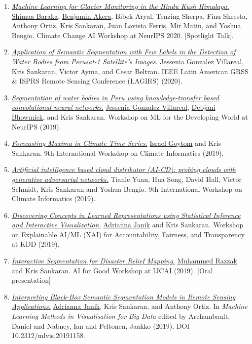 \documentclass[letterpaper]{article}
\begin{document}
\begin{enumerate}
  \item \href{https://www.climatechange.ai/papers/neurips2020/57}{\textit{Machine Learning for Glacier Monitoring in the Hindu Kush Himalaya.}} \underline{Shimaa Baraka}, \underline{Benjamin Akera}, Bibek Aryal, Tenzing Sherpa, Finu Shresta, Anthony Ortiz, Kris Sankaran, Juan Lavista Ferris, Mir Matin, and Yoshua Bengio. Climate Change AI Workshop at NeurIPS 2020. [Spotlight Talk].
  \item \href{https://ieeexplore.ieee.org/document/9165643/}{\textit{Application of Semantic Segmentation with Few Labels in the Detection of Water Bodies from Perusat-1 Satellite's Images.}} \underline{Jessenia Gonzalez Villareal}, Kris Sankaran, Victor Ayma, and Cesar Beltran. IEEE Latin American GRSS \& ISPRS Remote Sensing Conference (LAGIRS) (2020).
  \item \href{https://d-nb.info/1221274341/34}{\textit{Segmentation of water bodies in Peru using knowledge-transfer based convolutional neural networks.}} \underline{Jessenia Gonzalez Villareal}, \underline{Debjani Bhowmick}, and Kris Sankaran. Workshop on ML for the Developing World at NeurIPS (2019).
  \item \href{https://israelgoytom.com/papers/CI2019.pdf}{\textit{Forecasting Maxima in Climate Time Series.}} \underline{Israel Goytom} and Kris Sankaran. 9th International Workshop on Climate Informatics (2019).
  \item \href{https://ui.adsabs.harvard.edu/abs/2019AGUFM.A43E..05Y/abstract}{\textit{Artificial intelligence based cloud distributor (AI-CD): probing clouds with generative adversarial networks.}} Tianle Yuan, Hua Song, David Hall, Victor Schmidt, Kris Sankaran and Yoshua Bengio. 9th International Workshop on Climate Informatics (2019).
  \item \href{https://arxiv.org/abs/2202.04753}{\textit{Discovering Concepts in Learned Representations using Statistical Inference and Interactive Visualization.}} \underline{Adrianna Janik} and Kris Sankaran. Workshop on Explainable AI/ML (XAI) for Accountability, Fairness, and Transparency at KDD (2019).
  \item \href{http://krisrs1128.github.io/personal-site/projects/IJCAI_AI4G_Submission.pdf}{\textit{Interactive Segmentation for Disaster Relief Mapping.}} \underline{Muhammed Razzak} and Kris Sankaran. AI for Good Workshop at IJCAI (2019). [Oral presentation]
  \item \href{https://diglib.eg.org/items/3faa9eb7-7278-4c37-ba98-aace4a32b583}{\textit{Interpreting Black-Box Semantic Segmentation Models in Remote Sensing Applications.}} \underline{Adrianna Janik}, Kris Sankaran, and Anthony Ortiz. In \textit{Machine Learning Methods in Visualisation for Big Data} edited by Archambault, Daniel and Nabney, Ian and Peltonen, Jaakko (2019). DOI 10.2312/mlvis.20191158.

\end{enumerate}
\end{document}
